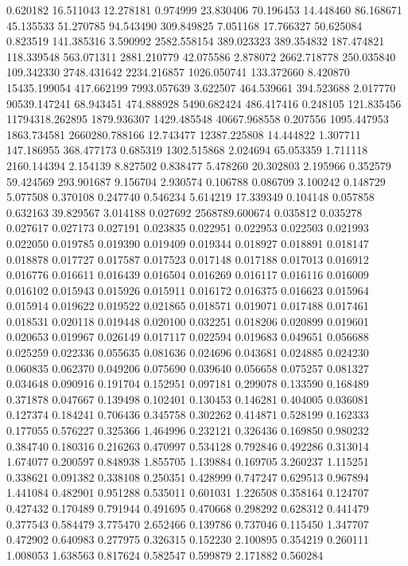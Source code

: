 0.620182
16.511043
12.278181
0.974999
23.830406
70.196453
14.448460
86.168671
45.135533
51.270785
94.543490
309.849825
7.051168
17.766327
50.625084
0.823519
141.385316
3.590992
2582.558154
389.023323
389.354832
187.474821
118.339548
563.071311
2881.210779
42.075586
2.878072
2662.718778
250.035840
109.342330
2748.431642
2234.216857
1026.050741
133.372660
8.420870
15435.199054
417.662199
7993.057639
3.622507
464.539661
394.523688
2.017770
90539.147241
68.943451
474.888928
5490.682424
486.417416
0.248105
121.835456
11794318.262895
1879.936307
1429.485548
40667.968558
0.207556
1095.447953
1863.734581
2660280.788166
12.743477
12387.225808
14.444822
1.307711
147.186955
368.477173
0.685319
1302.515868
2.024694
65.053359
1.711118
2160.144394
2.154139
8.827502
0.838477
5.478260
20.302803
2.195966
0.352579
59.424569
293.901687
9.156704
2.930574
0.106788
0.086709
3.100242
0.148729
5.077508
0.370108
0.247740
0.546234
5.614219
17.339349
0.104148
0.057858
0.632163
39.829567
3.014188
0.027692
2568789.600674
0.035812
0.035278
0.027617
0.027173
0.027191
0.023835
0.022951
0.022953
0.022503
0.021993
0.022050
0.019785
0.019390
0.019409
0.019344
0.018927
0.018891
0.018147
0.018878
0.017727
0.017587
0.017523
0.017148
0.017188
0.017013
0.016912
0.016776
0.016611
0.016439
0.016504
0.016269
0.016117
0.016116
0.016009
0.016102
0.015943
0.015926
0.015911
0.016172
0.016375
0.016623
0.015964
0.015914
0.019622
0.019522
0.021865
0.018571
0.019071
0.017488
0.017461
0.018531
0.020118
0.019448
0.020100
0.032251
0.018206
0.020899
0.019601
0.020653
0.019967
0.026149
0.017117
0.022594
0.019683
0.049651
0.056688
0.025259
0.022336
0.055635
0.081636
0.024696
0.043681
0.024885
0.024230
0.060835
0.062370
0.049206
0.075690
0.039640
0.056658
0.075257
0.081327
0.034648
0.090916
0.191704
0.152951
0.097181
0.299078
0.133590
0.168489
0.371878
0.047667
0.139498
0.102401
0.130453
0.146281
0.404005
0.036081
0.127374
0.184241
0.706436
0.345758
0.302262
0.414871
0.528199
0.162333
0.177055
0.576227
0.325366
1.464996
0.232121
0.326436
0.169850
0.980232
0.384740
0.180316
0.216263
0.470997
0.534128
0.792846
0.492286
0.313014
1.674077
0.200597
0.848938
1.855705
1.139884
0.169705
3.260237
1.115251
0.338621
0.091382
0.338108
0.250351
0.428999
0.747247
0.629513
0.967894
1.441084
0.482901
0.951288
0.535011
0.601031
1.226508
0.358164
0.124707
0.427432
0.170489
0.791944
0.491695
0.470668
0.298292
0.628312
0.441479
0.377543
0.584479
3.775470
2.652466
0.139786
0.737046
0.115450
1.347707
0.472902
0.640983
0.277975
0.326315
0.152230
2.100895
0.354219
0.260111
1.008053
1.638563
0.817624
0.582547
0.599879
2.171882
0.560284
